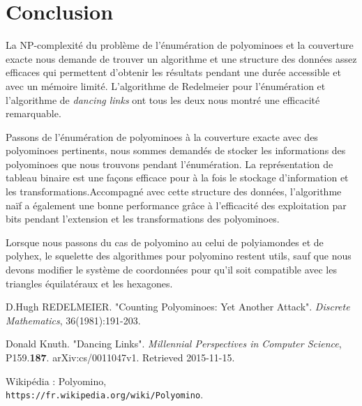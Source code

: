 \documentclass[a4paper,12pt]{article}
\begin{document}
\section{Conclusion}
\par La NP-complexité du problème de l'énumération de polyominoes et la couverture exacte nous demande de trouver un algorithme et une structure des données assez efficaces qui permettent d'obtenir les résultats pendant une durée accessible et avec un mémoire limité. L'algorithme de Redelmeier pour l'énumération et l'algorithme de \textit{dancing links} ont tous les deux nous montré une efficacité remarquable.
\par Passons de l'énumération de polyominoes à la couverture exacte avec des polyominoes pertinents, nous sommes demandés de stocker les informations des polyominoes que nous trouvons pendant l'énumération. La représentation de tableau binaire est une façons efficace pour à la fois le stockage d'information et les transformations.Accompagné avec cette structure des données, l'algorithme naïf a également une bonne performance grâce à l'efficacité des exploitation par bits pendant l'extension et les transformations des polyominoes.
\par Lorsque nous passons du cas de polyomino au celui de polyiamondes et de polyhex, le squelette des algorithmes pour polyomino restent utils, sauf que nous devons modifier le système de coordonnées pour qu'il soit compatible avec les triangles équilatéraux et les hexagones.

\newpage
\begin{thebibliography}{3}
	D.Hugh REDELMEIER.
	"Counting Polyominoes: Yet Another Attack".
	\textit{Discrete Mathematics}, 36(1981):191-203.
	
	Donald Knuth.
	"Dancing Links".
	\textit{Millennial Perspectives in Computer Science}, P159.\textbf{187}. arXiv:cs/0011047v1. Retrieved 2015-11-15.
	
	Wikipédia : Polyomino,
	\\\texttt{https://fr.wikipedia.org/wiki/Polyomino}.
	
\end{thebibliography}
\end{document}
